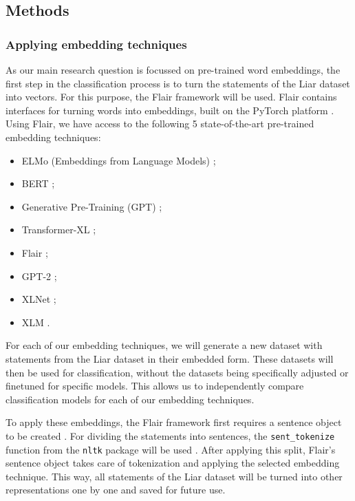 \subsection{Methods}

\subsubsection{Applying embedding techniques}
As our main research question is focussed on pre-trained word embeddings, the first step in the classification process is to turn the statements of the Liar dataset into vectors. 
For this purpose, the Flair framework will be used. 
Flair contains interfaces for turning words into embeddings, built on the PyTorch platform \cite{flairrepo}\cite{pytorch}. 
Using Flair, we have access to the following 5 state-of-the-art pre-trained embedding techniques: 
\begin{itemize}
    \item ELMo (Embeddings from Language Models) \cite{peters2018};
    \item BERT \cite{devlin2018};
    \item Generative Pre-Training (GPT) \cite{radford2018};
    \item Transformer-XL \cite{dai2019};
    \item Flair \cite{akbik2019};
    \item GPT-2 \cite{radford2019};
    \item XLNet ;
    \item XLM .
\end{itemize}

For each of our embedding techniques, we will generate a new dataset with statements from the Liar dataset in their embedded form. 
These datasets will then be used for classification, without the datasets being specifically adjusted or finetuned for specific models.
This allows us to independently compare classification models for each of our embedding techniques. 

To apply these embeddings, the Flair framework first requires a sentence object to be created \cite{flairsentence}.
For dividing the statements into sentences, the \texttt{sent\_tokenize} function from the \texttt{nltk} package will be used \cite{nltktokenize}. 
After applying this split, Flair's sentence object takes care of tokenization and applying the selected embedding technique.
This way, all statements of the Liar dataset will be turned into other representations one by one and saved for future use.

